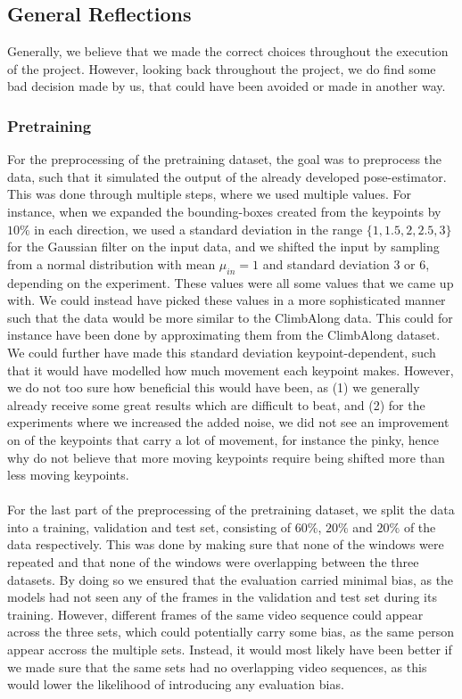 \documentclass[./main.tex]{subfiles}
\begin{document}
\subsection{General Reflections}
\label{sec:general_reflections}
Generally, we believe that we made the correct choices throughout the execution of the project. However, looking back throughout the project, we do find some bad decision made by us, that could have been avoided or made in another way.

\subsubsection{Pretraining}
For the preprocessing of the pretraining dataset, the goal was to preprocess the data, such that it simulated the output of the already developed pose-estimator. This was done through multiple steps, where we used multiple values. For instance, when we expanded the bounding-boxes created from the keypoints by $10\%$ in each direction, we used a standard deviation in the range $\{1, 1.5, 2, 2.5, 3\}$ for the Gaussian filter on the input data, and we shifted the input by sampling from a normal distribution with mean $\mu_{in} = 1$ and standard deviation $3$ or $6$, depending on the experiment. These values were all some values that we came up with. We could instead have picked these values in a more sophisticated manner such that the data would be more similar to the ClimbAlong data. This could for instance have been done by approximating them from the ClimbAlong dataset. We could further have made this standard deviation keypoint-dependent, such that it would have modelled how much movement each keypoint makes. However, we do not too sure how beneficial this would have been, as (1) we generally already receive some great results which are difficult to beat, and (2) for the experiments where we increased the added noise, we did not see an improvement on of the keypoints that carry a lot of movement, for instance the pinky, hence why do not believe that more moving keypoints require being shifted more than less moving keypoints.
\\
\\
For the last part of the preprocessing of the pretraining dataset, we split the data into a training, validation and test set, consisting of $60\%$, $20\%$ and $20\%$ of the data respectively. This was done by making sure that none of the windows were repeated and that none of the windows were overlapping between the three datasets. By doing so we ensured that the evaluation carried minimal bias, as the models had not seen any of the frames in the validation and test set during its training. However, different frames of the same video sequence could appear across the three sets, which could potentially carry some bias, as the same person appear accross the multiple sets. Instead, it would most likely have been better if we made sure that the same sets had no overlapping video sequences, as this would lower the likelihood of introducing any evaluation bias.
\end{document}
